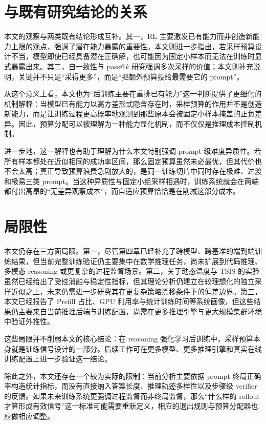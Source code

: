 \section{与既有研究结论的关系}

本文的观察与两类既有结论形成互补。其一，RL 主要激发已有能力而非创造新能力上限的观点，强调了潜在能力暴露的重要性\citep{kim2025reinforcement}。本文则进一步指出，若采样预算设计不当，模型即使已经具备潜在正确解，也可能因为固定小样本而无法在训练时显式暴露出来。其二，自一致性与 pass@$k$ 研究强调多次采样的价值\citep{chen2021codex,wang2022selfconsistency}；本文则补充说明，关键并不只是“采得更多”，而是“把额外预算投给最需要它的 prompt”。

从这个意义上看，本文也为“后训练主要在重排已有能力”这一判断提供了更细化的机制解释：当模型已有能力以高方差形式隐含存在时，采样预算的作用并不是创造新能力，而是让训练过程更高概率地观测到那些原本会被固定小样本掩盖的正负差异。因此，预算分配可以被理解为一种能力显化机制，而不仅仅是推理成本控制机制。

进一步地，这一解释也有助于理解为什么本文特别强调 prompt 级难度异质性。若所有样本都处在近似相同的成功率区间，那么固定预算虽然未必最优，但其代价也不会太高；真正导致预算浪费急剧放大的，是同一训练切片中同时存在极难、过渡和极易三类 prompt。当这种异质性与固定小组采样相遇时，训练系统就会在两端都付出高昂的“无差异观察成本”，而自适应预算恰恰是在削减这部分成本。

\section{局限性}

本文仍存在三方面局限。第一，尽管第四章已经补充了跨模型、跨基准的端到端训练结果，但当前完整训练验证仍主要集中在数学推理任务，尚未扩展到代码推理、多模态 reasoning 或更复杂的过程监督场景。第二，关于动态温度与 TSIS 的实验虽然已经给出了受控消融与稳定性指标，但其理论分析仍建立在较理想化的独立采样近似之上，未来仍需进一步研究其在更复杂策略漂移条件下的偏差边界。第三，本文已经报告了 Prefill 占比、GPU 利用率与统计训练时间等系统画像，但这些结果仍主要来自当前推理后端与训练配置，尚需在更多推理引擎与更大规模集群环境中验证外推性。

这些局限并不削弱本文的核心结论：在 reasoning 强化学习后训练中，采样预算本身就是训练信号设计的一部分。后续工作可在更多模型、更多推理引擎和真实在线训练配置上进一步验证这一结论。

除此之外，本文还存在一个较为实际的限制：当前分析主要依据 prompt 终局正确率构造统计指标，而没有直接纳入答案长度、推理轨迹多样性以及步骤级 verifier 的反馈。如果未来训练系统更强调过程监督而非终局监督，那么“什么样的 rollout 才算形成有效信号”这一标准可能需要重新定义，相应的退出规则与预算分配器也应做相应调整。

